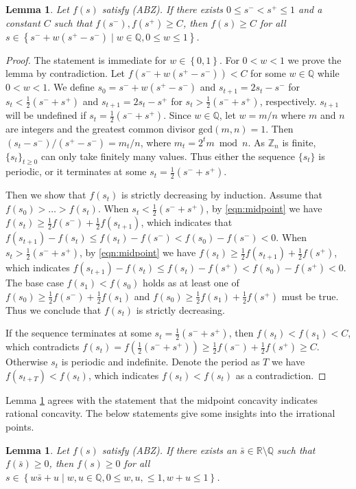 \documentclass{article}
\newtheorem{lemma}[theorem]{Lemma}
\theoremstyle{named}
\newcommand{\RR}{\mathbb{R}}
\newcommand{\QQ}{\mathbb{Q}}
\newcommand{\ZZ}{\mathbb{Z}}
\newcommand{\set}[1]{\left\{#1\right\}}
\begin{document}
\begin{lemma}
\label{clm:rationallb}
Let $f(s)$ satisfy ({ABZ}). If there exists $0\leq s^-<s^+\leq 1$ and a constant $C$ such that $f(s^-), f(s^+)\geq C$, then $f(s)\geq C$ for all $s\in \set{s^-+w(s^+-s^-)\mid w\in \QQ, 0\leq w\leq 1}$.
\end{lemma}

\begin{proof}
The statement is immediate for $w\in \set{0,1}$. For $0<w<1$ we prove the lemma by contradiction. Let $f(s^-+w(s^+-s^-))<C$ for some $w\in \QQ$ while $0<w<1$. We define $s_0=s^-+w(s^+-s^-)$ and $s_{t+1}=2s_t-s^-$ for $s_t<\frac{1}{2}(s^-+s^+)$ and $s_{t+1}=2s_t-s^+$ for $s_t>\frac{1}{2}(s^-+s^+)$, respectively. $s_{t+1}$ will be undefined if $s_t=\frac{1}{2}(s^-+s^+)$. Since $w\in \QQ$, let $w=m/n$ where $m$ and $n$ are integers and the greatest common divisor $\text{gcd}(m,n)=1$. Then $(s_t-s^-)/(s^+-s^-)=m_t/n$, where $m_t=2^tm \bmod n$. As $\ZZ_n$ is finite, $\{s_t\}_{t\geq 0}$ can only take finitely many values. Thus either the sequence $\{s_t\}$ is periodic, or it terminates at some $s_t=\frac{1}{2}(s^-+s^+)$.

Then we show that $f(s_t)$ is strictly decreasing by induction. Assume that $f(s_0)>\dots>f(s_t)$. When $s_t<\frac{1}{2}(s^-+s^+)$, by \eqref{eqn:midpoint} we have $f(s_t)\geq \frac{1}{2}f(s^-)+\frac{1}{2}f(s_{t+1})$, which indicates that $f(s_{t+1})-f(s_t)\leq f(s_t)-f(s^-)<f(s_0)-f(s^-)<0$. When $s_t>\frac{1}{2}(s^-+s^+)$, by \eqref{eqn:midpoint} we have $f(s_t)\geq \frac{1}{2}f(s_{t+1})+\frac{1}{2}f(s^+)$, which indicates $f(s_{t+1})-f(s_t)\leq f(s_t)-f(s^+)<f(s_0)-f(s^+)<0$. The base case $f(s_1)<f(s_0)$ holds as at least one of $f(s_0)\geq \frac{1}{2}f(s^-)+\frac{1}{2}f(s_1)$ and $f(s_0)\geq \frac{1}{2}f(s_1)+\frac{1}{2}f(s^+)$ must be true. Thus we conclude that $f(s_t)$ is strictly decreasing.

If the sequence terminates at some $s_t=\frac{1}{2}(s^-+s^+)$, then $f(s_t)<f(s_1)<C$, which contradicts $f(s_t)=f(\frac{1}{2}(s^-+s^+))\geq \frac{1}{2}f(s^-)+\frac{1}{2}f(s^+)\geq C$. Otherwise $s_t$ is periodic and indefinite. Denote the period as $T$ we have $f(s_{t+T})<f(s_t)$, which indicates $f(s_t)<f(s_t)$ as a contradiction.
\end{proof}

Lemma \ref{clm:rationallb} agrees with the statement that the midpoint concavity indicates rational concavity. The below statements give some insights into the irrational points.

\begin{lemma}
\label{clm:rationallb2}
Let $f(s)$ satisfy ({ABZ}). If there exists an $\bar{s}\in \RR\setminus\QQ$ such that $f(\bar{s})\geq 0$, then $f(s)\geq 0$ for all $s\in \set{w\bar{s}+u\mid w,u\in \QQ, 0\leq w, u, \leq 1, w+u\leq 1}$.
\end{lemma}
\end{document}
